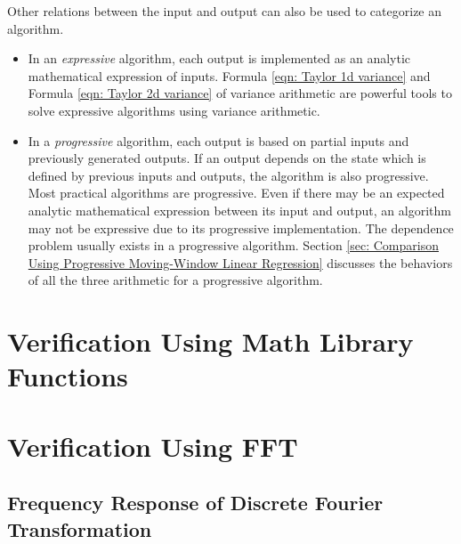 \documentclass[twoside]{article}
\numberwithin{equation}{section}
\begin{document}
Other relations between the input and output can also be used to categorize an algorithm.  
\begin{itemize}
\item  In an \emph{expressive} algorithm, each output is implemented as an analytic mathematical expression of inputs.  
Formula \eqref{eqn: Taylor 1d variance} and Formula \eqref{eqn: Taylor 2d variance} of variance arithmetic are powerful tools to solve expressive algorithms using variance arithmetic.  

\item  In a \emph{progressive} algorithm, each output is based on partial inputs and previously generated outputs.  
If an output depends on the state which is defined by previous inputs and outputs, the algorithm is also progressive.  
Most practical algorithms are progressive.  
Even if there may be an expected analytic mathematical expression between its input and output, an algorithm may not be expressive due to its progressive implementation.  
The dependence problem usually exists in a progressive algorithm.  
Section \ref{sec: Comparison Using Progressive Moving-Window Linear Regression} discusses the behaviors of all the three arithmetic for a progressive algorithm.
\end{itemize}


\clearpage
\section{Verification Using Math Library Functions}
\label{sec: Math Library}





\clearpage
\section{Verification Using FFT}
\label{sec: FFT}


\subsection{Frequency Response of Discrete Fourier Transformation}
\end{document}

